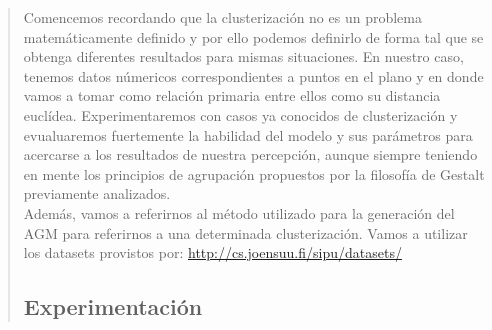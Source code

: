 \documentclass[11pt,a4paper]{article}
\begin{document}
\begin{verse}
Comencemos recordando que la clusterización no es un problema matemáticamente definido y por ello podemos definirlo de forma tal que se obtenga diferentes resultados para mismas situaciones. 
En nuestro caso, tenemos datos númericos correspondientes a puntos en el plano y en donde vamos a tomar como relación primaria entre ellos como su distancia euclídea. Experimentaremos con casos ya conocidos de clusterización y evualuaremos fuertemente la habilidad del modelo y sus parámetros para acercarse a los resultados de nuestra percepción, aunque siempre teniendo en mente los principios de agrupación propuestos por la filosofía de Gestalt previamente analizados.\\
Además, vamos a referirnos al método utilizado para la generación del AGM para referirnos a una determinada clusterización. Vamos a utilizar los datasets provistos por: \url{http://cs.joensuu.fi/sipu/datasets/}

\subsection{Experimentación}


\end{verse}
\end{document}

